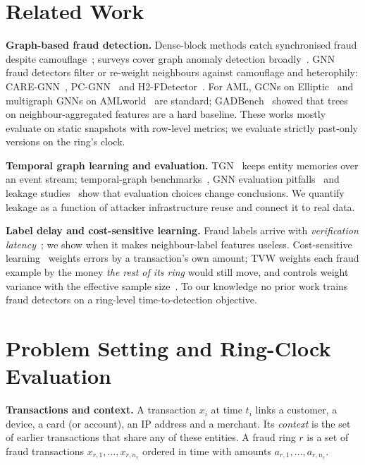\documentclass[10pt,letterpaper]{article}
\begin{document}
\section{Related Work}
\textbf{Graph-based fraud detection.} Dense-block methods catch synchronised fraud despite camouflage~\cite{hooi2016fraudar}; surveys cover graph anomaly detection broadly~\cite{akoglu2015survey,ma2021gadsurvey}. GNN fraud detectors filter or re-weight neighbours against camouflage and heterophily: CARE-GNN~\cite{dou2020care}, PC-GNN~\cite{liu2021pcgnn} and H2-FDetector~\cite{shi2022h2}. For AML, GCNs on Elliptic~\cite{weber2019elliptic} and multigraph GNNs on AMLworld~\cite{egressy2024multigraph,altman2023aml} are standard; GADBench~\cite{tang2023gadbench} showed that trees on neighbour-aggregated features are a hard baseline. These works mostly evaluate on static snapshots with row-level metrics; we evaluate strictly past-only versions on the ring's clock.

\textbf{Temporal graph learning and evaluation.} TGN~\cite{rossi2020tgn} keeps entity memories over an event stream; temporal-graph benchmarks~\cite{poursafaei2022eval,huang2023tgb}, GNN evaluation pitfalls~\cite{shchur2018pitfalls} and leakage studies~\cite{kapoor2023leakage} show that evaluation choices change conclusions. We quantify leakage as a function of attacker infrastructure reuse and connect it to real data.

\textbf{Label delay and cost-sensitive learning.} Fraud labels arrive with \emph{verification latency}~\cite{dalpozzolo2018latency}; we show when it makes neighbour-label features useless. Cost-sensitive learning~\cite{elkan2001cost,bahnsen2015costsensitive} weights errors by a transaction's own amount; TVW weights each fraud example by the money \emph{the rest of its ring} would still move, and controls weight variance with the effective sample size~\cite{kong1992ess}. To our knowledge no prior work trains fraud detectors on a ring-level time-to-detection objective.

\section{Problem Setting and Ring-Clock Evaluation}\label{sec:protocol}
\textbf{Transactions and context.} A transaction $x_i$ at time $t_i$ links a customer, a device, a card (or account), an IP address and a merchant. Its \emph{context} is the set of earlier transactions that share any of these entities. A fraud ring $r$ is a set of fraud transactions $x_{r,1},\dots,x_{r,n_r}$ ordered in time with amounts $a_{r,1},\dots,a_{r,n_r}$.
\end{document}
